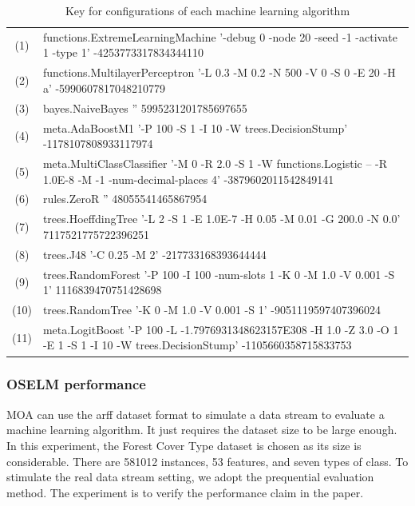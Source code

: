 \documentclass[a4paper, 14pt]{extarticle}
\begin{document}
\begin{landscape}
\begin{table}[thb]
\caption{\label{tab:m-emlbaseKeys}Key for configurations of each machine learning algorithm}
\scriptsize
{\centering
\begin{tabular}{cl}\\
(1) & functions.ExtremeLearningMachine '-debug 0 -node 20 -seed -1 -activate 1 -type 1' -4253773317834344110 \\
(2) & functions.MultilayerPerceptron '-L 0.3 -M 0.2 -N 500 -V 0 -S 0 -E 20 -H a' -5990607817048210779 \\
(3) & bayes.NaiveBayes '' 5995231201785697655 \\
(4) & meta.AdaBoostM1 '-P 100 -S 1 -I 10 -W trees.DecisionStump' -1178107808933117974 \\
(5) & meta.MultiClassClassifier '-M 0 -R 2.0 -S 1 -W functions.Logistic -- -R 1.0E-8 -M -1 -num-decimal-places 4' -3879602011542849141 \\
(6) & rules.ZeroR '' 48055541465867954 \\
(7) & trees.HoeffdingTree '-L 2 -S 1 -E 1.0E-7 -H 0.05 -M 0.01 -G 200.0 -N 0.0' 7117521775722396251 \\
(8) & trees.J48 '-C 0.25 -M 2' -217733168393644444 \\
(9) & trees.RandomForest '-P 100 -I 100 -num-slots 1 -K 0 -M 1.0 -V 0.001 -S 1' 1116839470751428698 \\
(10) & trees.RandomTree '-K 0 -M 1.0 -V 0.001 -S 1' -9051119597407396024 \\
(11) & meta.LogitBoost '-P 100 -L -1.7976931348623157E308 -H 1.0 -Z 3.0 -O 1 -E 1 -S 1 -I 10 -W trees.DecisionStump' -1105660358715833753 \\
\end{tabular}
}
\end{table}

\end{landscape}



\subsubsection{OSELM performance}
\par MOA can use the arff dataset format to simulate a data stream to evaluate a machine learning algorithm. It just requires the dataset size to be large enough. In this experiment, the Forest Cover Type dataset is chosen as its size is considerable. There are 581012 instances, 53 features, and seven types of class. To stimulate the real data stream setting, we adopt the prequential evaluation method. The experiment is to verify the performance claim in the paper\cite{liang2006fast}. 
\end{document}
